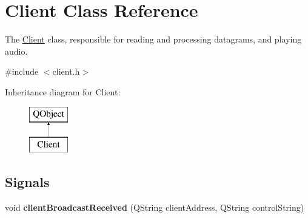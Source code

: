 \hypertarget{class_client}{\section{Client Class Reference}
\label{class_client}
}


The \hyperlink{class_client}{Client} class, responsible for reading and processing datagrams, and playing audio.  




{\ttfamily \#include $<$client.\+h$>$}

Inheritance diagram for Client\+:\begin{figure}[H]
\begin{center}
\leavevmode
\includegraphics[height=2.000000cm]{class_client}
\end{center}
\end{figure}
\subsection*{Signals}
\begin{DoxyCompactItemize}
\item 
\hypertarget{class_client_a988a44e569be731da0d7186afa965b7c}{void {\bfseries client\+Broadcast\+Received} (Q\+String client\+Address, Q\+String control\+String)}\label{class_client_a988a44e569be731da0d7186afa965b7c}

\end{DoxyCompactItemize}
